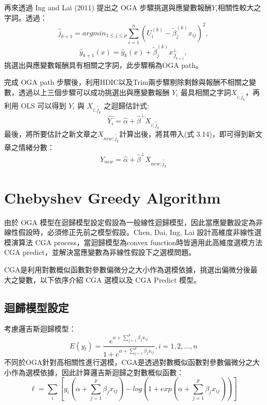 再來透過 Ing and Lai (2011) 提出之 OGA 步驟挑選與應變數報酬$Y_i$相關性較大之字詞。透過：
\begin{equation}
\displaystyle \hat{j}_{k+1}=argmin_{1\leq j \leq p}\sum_{i=1}^{n}(U_i^{(k)}-\tilde{\beta}_j^{(k)}x_{ij})^2,
\end{equation}
\begin{equation}
\hat{y}_{k+1}(x)=\hat{y}_{k}(x)+ \tilde{\beta}_j^{(k)}x_{\hat{J}_{k+1}}^{\bot}, 
\end{equation}
挑選出與應變數報酬具有相關之字詞，此步驟稱為OGA path。


完成 OGA path 步驟後，利用HDIC以及Trim兩步驟剔除剩餘與報酬不相關之變數，透過以上三個步驟可以成功挑選出與應變數報酬 $Y_i$ 最具相關之字詞$X_{i;\hat{j}_k}$，再利用 OLS 可以得到 $Y_i$ 與 $X_{i;\hat{j}_k}$ 之迴歸估計式:
\begin{equation}
\hat{Y_i} = \hat{\alpha} + \hat{\beta}^{\bot}X_{i;\hat{j}_k}
\end{equation}
最後，將所要估計之新文章之$X_{new;\hat{j}_k}$計算出後，將其帶入(式 3.14)，即可得到新文章之情緒分數：
\begin{equation}
Y_{new} = \hat{\alpha} + \hat{\beta}^{\bot}X_{new;\hat{j}_k}
\end{equation}

\newpage

\section{Chebyshev Greedy Algorithm}
由於 OGA 模型在迴歸模型設定假設為一般線性迴歸模型，因此當應變數設定為非線性假設時，必須修正先前之模型假設。Chen, Dai, Ing, Lai 設計高維度非線性選模演算法 CGA process，當迴歸模型為convex function時皆適用此高維度選模方法CGA predict，並解決當應變數為非線性假設下之選模問題。

CGA是利用對數概似函數對參數偏微分之大小作為選模依據，挑選出偏微分後最大之變數，以下依序介紹 CGA 選模以及 CGA Predict 模型。
\subsection{迴歸模型設定}
考慮邏吉斯迴歸模型：
\begin{equation}
E(y_t) = \displaystyle \frac{e^{\alpha+\sum_{j=1}^{p}\beta_jx_{ij}}}{1+e^{\alpha+\sum_{j=1}^{p}\beta_jx_{ij}}}, i = 1,2,\ldots,n
\end{equation}
不同於OGA針對高相關性進行選模，CGA是透過對數概似函數對參數偏微分之大小作為選模依據，因此計算邏吉斯迴歸之對數概似函數：
\begin{equation}
\ell = \sum_{i}[y_i(\alpha + \sum_{j=1}^{p}\beta_jx_{ij}) - log(1 + exp(\alpha+\sum_{j=1}^{p}\beta_jx_{ij}))]
\end{equation}

